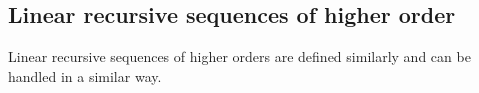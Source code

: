 \subsection{Linear recursive sequences of higher order}
Linear recursive sequences of higher orders are defined similarly and can be handled in a similar way.